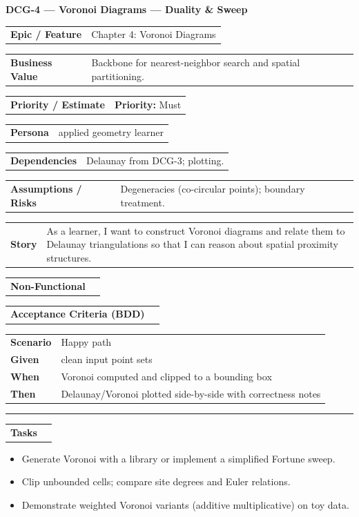 \documentclass[11pt,a4paper]{article}
\makeatletter
\newcommand{\FieldRow}[2]{%
  \noindent\begin{tabularx}{\linewidth}{@{}>{\bfseries}l X@{}}#1 & #2\\\end{tabularx}%
}
\newcommand{\CardDivider}{\par\noindent\color{CardBorder}\rule{\linewidth}{0.4pt}\par\noindent\color{black}}
\newcommand{\StoryHeader}[2]{%
  {\large\bfseries \textcolor{CardTitle}{#1} --- #2}
}
\newcommand{\BDD}[4]{%
  \FieldRow{Acceptance Criteria (BDD)}{}
  \vspace{-0.75\baselineskip}
  \begin{tabularx}{\linewidth}{@{}>{\bfseries}l X@{}}
  Scenario & #1\\
  Given & #2\\
  When & #3\\
  Then & #4\\
  \end{tabularx}
}
\newenvironment{TaskList}{%
  \begin{itemize}[leftmargin=1.25em,label=\(\square\)]
}{\end{itemize}}
\makeatother
\begin{document}
\begin{StoryCardBox}
\StoryHeader{DCG-4}{Voronoi Diagrams — Duality \& Sweep}\\[0.4em]
\FieldRow{Epic / Feature}{Chapter 4: Voronoi Diagrams}
\FieldRow{Business Value}{Backbone for nearest-neighbor search and spatial partitioning.}
\FieldRow{Priority / Estimate}{\textbf{Priority:} Must \quad \nfchip{SP: 5}}
\FieldRow{Persona}{applied geometry learner}
\FieldRow{Dependencies}{Delaunay from DCG-3; plotting.}
\FieldRow{Assumptions / Risks}{Degeneracies (co-circular points); boundary treatment.}
\FieldRow{Story}{As a learner, I want to construct Voronoi diagrams and relate them to Delaunay triangulations so that I can reason about spatial proximity structures.}

\FieldRow{Non-Functional}{\nfchip{Performance} \nfchip{Clarity} \nfchip{Reproducibility}}

\BDD{Happy path}{clean input point sets}{Voronoi computed and clipped to a bounding box}{Delaunay/Voronoi plotted side-by-side with correctness notes}

\CardDivider
\FieldRow{\large Tasks}{}
\begin{TaskList}
  \item Generate Voronoi with a library or implement a simplified Fortune sweep.
  \item Clip unbounded cells; compare site degrees and Euler relations.
  \item Demonstrate weighted Voronoi variants (additive multiplicative) on toy data.
\end{TaskList}
\end{StoryCardBox}
\end{document}
